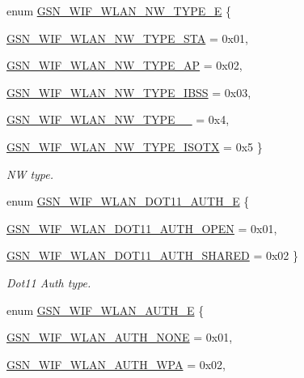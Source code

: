 \begin{DoxyCompactItemize}
\item 
enum \hyperlink{a00677_ga4d89b2a0c901a8c766f195897f16623f}{GSN\_\-WIF\_\-WLAN\_\-NW\_\-TYPE\_\-E} \{ \par
\hyperlink{a00640_gga4d89b2a0c901a8c766f195897f16623faa311500f825dc8fd0001c0d8a6917605}{GSN\_\-WIF\_\-WLAN\_\-NW\_\-TYPE\_\-STA} =  0x01, 
\par
\hyperlink{a00640_gga4d89b2a0c901a8c766f195897f16623fa6005fc49b47b857a5d371c912c1bf3fd}{GSN\_\-WIF\_\-WLAN\_\-NW\_\-TYPE\_\-AP} =  0x02, 
\par
\hyperlink{a00640_gga4d89b2a0c901a8c766f195897f16623faf57bc7deeac6ae399614faf0b9d20fba}{GSN\_\-WIF\_\-WLAN\_\-NW\_\-TYPE\_\-IBSS} =  0x03, 
\par
\hyperlink{a00640_gga4d89b2a0c901a8c766f195897f16623faa63e066458c172dea3b093f1bed382c6}{GSN\_\-WIF\_\-WLAN\_\-NW\_\-TYPE\_\_} =  0x4, 
\par
\hyperlink{a00640_gga4d89b2a0c901a8c766f195897f16623fa4d99b481ead0aaa86d901a99899befef}{GSN\_\-WIF\_\-WLAN\_\-NW\_\-TYPE\_\-ISOTX} =  0x5
 \}
\begin{DoxyCompactList}\small\item\em NW type. \end{DoxyCompactList}\item 
enum \hyperlink{a00677_ga5415d31a2d60b731af07dc04240e540c}{GSN\_\-WIF\_\-WLAN\_\-DOT11\_\-AUTH\_\-E} \{ \par
\hyperlink{a00640_gga5415d31a2d60b731af07dc04240e540cad9009c323b9b80ec4a57c22a6a42bf20}{GSN\_\-WIF\_\-WLAN\_\-DOT11\_\-AUTH\_\-OPEN} =  0x01, 
\par
\hyperlink{a00640_gga5415d31a2d60b731af07dc04240e540cafc5f6649938bc4669e367f043b84fdac}{GSN\_\-WIF\_\-WLAN\_\-DOT11\_\-AUTH\_\-SHARED} =  0x02
 \}
\begin{DoxyCompactList}\small\item\em Dot11 Auth type. \end{DoxyCompactList}\item 
enum \hyperlink{a00677_ga2b3917a91d576d0d037c406e6397cab9}{GSN\_\-WIF\_\-WLAN\_\-AUTH\_\-E} \{ \par
\hyperlink{a00640_gga2b3917a91d576d0d037c406e6397cab9abe5ad72eaf443c01179b9fdd3e44ad94}{GSN\_\-WIF\_\-WLAN\_\-AUTH\_\-NONE} =  0x01, 
\par
\hyperlink{a00640_gga2b3917a91d576d0d037c406e6397cab9a9b0bab6a04025a0c9a9094fcd005b288}{GSN\_\-WIF\_\-WLAN\_\-AUTH\_\-WPA} =  0x02, 
\par

\end{DoxyCompactItemize}
